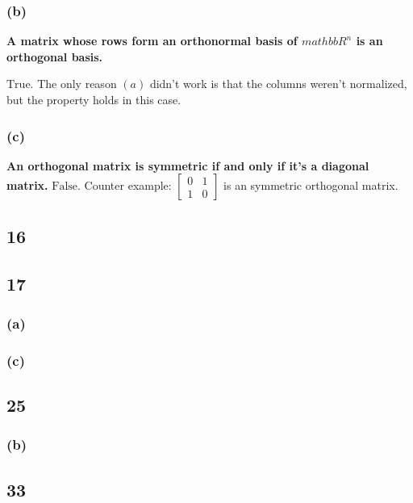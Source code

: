 \documentclass[10pt,letterpaper]{article}
\begin{document}
	\subsubsection*{(b)} \textbf{A matrix whose rows form an orthonormal basis of $mathbb{R}^n$ is an orthogonal basis. } 
	
	$\boxed{\text{True}}$. The only reason $(a)$ didn't work is that the columns weren't normalized, but the property holds in this case. 
	\subsubsection*{(c)} \textbf{An orthogonal matrix is symmetric if and only if it's a diagonal matrix. }
	$\boxed{\text{False}}$. Counter example: $\begin{bmatrix}
	0 & 1 \\ 1 & 0 
	\end{bmatrix}$ is an symmetric orthogonal matrix. 
	\subsection*{16}
	\subsection*{17}
	\subsubsection*{(a)}
	\subsubsection*{(c)}
	\subsection*{25}
	\subsubsection*{(b)}
	\subsection*{33}
	
\end{document}
